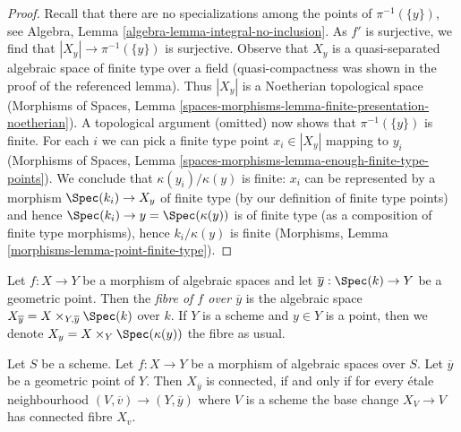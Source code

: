 \begin{proof}
Recall that there are no specializations among the points of $\pi^{-1}(\{y\})$,
see Algebra, Lemma \ref{algebra-lemma-integral-no-inclusion}.
As $f'$ is surjective, we find that $|X_y| \to \pi^{-1}(\{y\})$ is surjective.
Observe that $X_y$ is a quasi-separated algebraic space of finite type
over a field (quasi-compactness was shown in the proof of the
referenced lemma). Thus $|X_y|$ is a Noetherian topological space
(Morphisms of Spaces, Lemma
\ref{spaces-morphisms-lemma-finite-presentation-noetherian}).
A topological argument (omitted) now shows that $\pi^{-1}(\{y\})$ is finite.
For each $i$ we can pick a finite type point $x_i \in |X_y|$
mapping to $y_i$ (Morphisms of Spaces, Lemma
\ref{spaces-morphisms-lemma-enough-finite-type-points}).
We conclude that $\kappa(y_i)/\kappa(y)$ is finite:
$x_i$ can be represented by a morphism $\Spec(k_i) \to X_y$
of finite type (by our definition of finite type points)
and hence $\Spec(k_i) \to y = \Spec(\kappa(y))$ is of finite type
(as a composition of finite type morphisms),
hence $k_i/\kappa(y)$ is finite (Morphisms, Lemma
\ref{morphisms-lemma-point-finite-type}).
\end{proof}

\noindent
Let $f : X \to Y$ be a morphism of algebraic spaces and let
$\overline{y} : \Spec(k) \to Y$ be a geometric point. Then the
{\it fibre of $f$ over $\overline{y}$} is the algebraic space
$X_{\overline{y}} = X \times_{Y, \overline{y}} \Spec(k)$ over $k$.
If $Y$ is a scheme and $y \in Y$ is a point, then we denote
$X_y = X \times_Y \Spec(\kappa(y))$ the fibre as usual.

\begin{lemma}
\label{lemma-characterize-geometrically-connected-fibres}
Let $S$ be a scheme. Let $f : X \to Y$ be a morphism of algebraic spaces
over $S$. Let $\overline{y}$ be a geometric point of $Y$. Then
$X_{\overline{y}}$ is connected, if and only if for every \'etale
neighbourhood $(V, \overline{v}) \to (Y, \overline{y})$ where $V$
is a scheme the base change $X_V \to V$ has connected fibre $X_v$.
\end{lemma}

